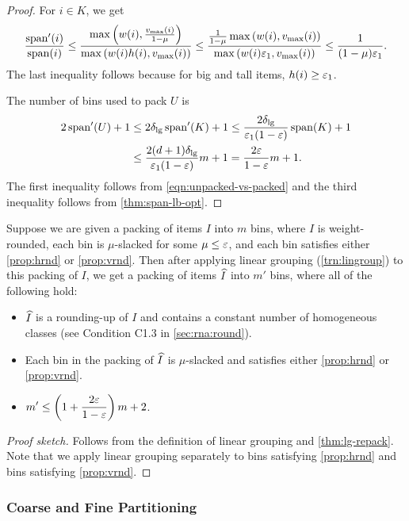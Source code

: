 \begin{proof}
For $i \in K$, we get
\begin{align*}
\frac{\operatorname{span}'(i)}{\operatorname{span}(i)}
\le \frac{\max\left(w(i), \frac{v_{\max}(i)}{1 - \mu}\right)}{
\max\left(w(i)h(i), v_{\max}(i)\right)}
\le \frac{\frac{1}{1-\mu}\max\left(w(i), v_{\max}(i)\right)}{
\max\left(w(i)\varepsilon_1, v_{\max}(i)\right)}
\le \frac{1}{(1-\mu)\varepsilon_1}.
\end{align*}
The last inequality follows because for big and tall items, $h(i) \ge \varepsilon_1$.

The number of bins used to pack $U$ is
\begin{align*}
2\operatorname{span}'(U) + 1
&\le 2\delta_{\mathrm{lg}} \operatorname{span}'(K) + 1
\le \frac{2\delta_{\mathrm{lg}}}{\varepsilon_1(1-\varepsilon)} \operatorname{span}(K) + 1
\\ &\le \frac{2(d+1)\delta_{\mathrm{lg}}}{\varepsilon_1(1-\varepsilon)}m + 1
= \frac{2\varepsilon}{1-\varepsilon}m + 1.
\end{align*}
The first inequality follows from \eqref{eqn:unpacked-vs-packed} and the third
inequality follows from \cref{thm:span-lb-opt}.
\end{proof}

\begin{lemma}
\label{lem:rnd2}
Suppose we are given a packing of items $I$ into $m$ bins,
where $I$ is weight-rounded, each bin is $\mu$-slacked for some $\mu \le \varepsilon$,
and each bin satisfies either \cref{prop:hrnd} or \cref{prop:vrnd}.
Then after applying linear grouping (\cref{trn:lingroup}) to this packing of $I$,
we get a packing of items $\widehat{I}$ into $m'$ bins, where all of the following hold:
\begin{itemize}
\item $\widehat{I}$ is a rounding-up of $I$ and contains a constant number of homogeneous classes
    (see Condition C1.3 in \cref{sec:rna:round}).
\item Each bin in the packing of $\widehat{I}$ is $\mu$-slacked
    and satisfies either \cref{prop:hrnd} or \cref{prop:vrnd}.
\item ${\displaystyle m' \le \left(1 + \frac{2\varepsilon}{1-\varepsilon}\right)m + 2}$.
\end{itemize}
\end{lemma}
\begin{proof}[Proof sketch]
Follows from the definition of linear grouping and \cref{thm:lg-repack}.
Note that we apply linear grouping separately to bins satisfying \cref{prop:hrnd}
and bins satisfying \cref{prop:vrnd}.
\end{proof}

\subsubsection{Coarse and Fine Partitioning}

